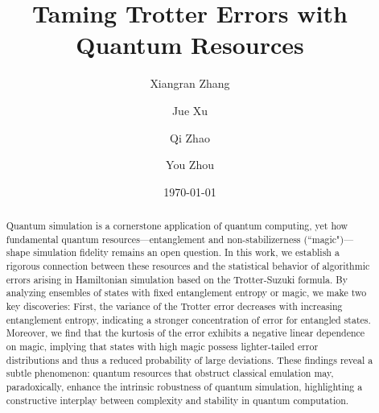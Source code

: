 \documentclass[showpacs,amsmath,amssymb,twocolumn,aps,pra,superscriptaddress,notitlepage,10pt]{revtex4-2}
\begin{document}
\title{Taming Trotter Errors with Quantum Resources}
\date{\today}
\author{Xiangran Zhang}
\author{Jue Xu}
\author{Qi Zhao}
\author{You Zhou}

\begin{abstract}
Quantum simulation is a cornerstone application of quantum computing, yet how fundamental quantum resources—entanglement and non-stabilizerness (``magic")—shape simulation fidelity remains an open question.
In this work, we establish a rigorous connection between these resources and the statistical behavior of algorithmic errors arising in Hamiltonian simulation based on the Trotter-Suzuki formula. By analyzing ensembles of states with fixed entanglement entropy or magic, we make two key discoveries: First, the variance of the Trotter error decreases with increasing entanglement entropy, indicating a stronger concentration of error for entangled states. Moreover, we find that the kurtosis of the error exhibits a negative linear dependence on magic, implying that states with high magic possess lighter-tailed error distributions and thus a reduced probability of large deviations.
These findings reveal a subtle phenomenon: quantum resources that obstruct classical emulation may, paradoxically, enhance the intrinsic robustness of quantum simulation, highlighting a constructive interplay between complexity and stability in quantum computation.
\end{abstract}
\end{document}
